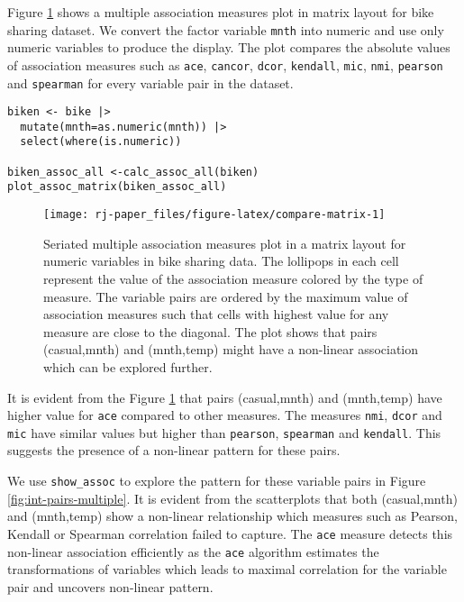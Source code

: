 Figure \ref{fig:compare-matrix} shows a multiple association measures plot in matrix layout for bike sharing dataset. We convert the factor variable \texttt{mnth} into numeric and use only numeric variables to produce the display. The plot compares the absolute values of association measures such as \texttt{ace}, \texttt{cancor}, \texttt{dcor}, \texttt{kendall}, \texttt{mic}, \texttt{nmi}, \texttt{pearson} and \texttt{spearman} for every variable pair in the dataset.

\begin{verbatim}
biken <- bike |>
  mutate(mnth=as.numeric(mnth)) |>
  select(where(is.numeric))

biken_assoc_all <-calc_assoc_all(biken)
plot_assoc_matrix(biken_assoc_all) 
\end{verbatim}

\begin{figure}

{\centering \texttt{[image: rj-paper\_files/figure-latex/compare-matrix-1]} 

}

\caption{Seriated multiple association measures plot in a matrix layout for numeric variables in bike sharing data. The lollipops in each cell represent the value of the association measure colored by the type of measure. The variable pairs are ordered by the maximum value of association measures such that cells with highest value for any measure are close to the diagonal. The plot shows that pairs (casual,mnth) and (mnth,temp) might have a non-linear association which can be explored further.}\label{fig:compare-matrix}
\end{figure}

It is evident from the Figure \ref{fig:compare-matrix} that pairs (casual,mnth) and (mnth,temp) have higher value for \texttt{ace} compared to other measures. The measures \texttt{nmi}, \texttt{dcor} and \texttt{mic} have similar values but higher than \texttt{pearson}, \texttt{spearman} and \texttt{kendall}. This suggests the presence of a non-linear pattern for these pairs.

We use \texttt{show\_assoc} to explore the pattern for these variable pairs in Figure \ref{fig:int-pairs-multiple}. It is evident from the scatterplots that both (casual,mnth) and (mnth,temp) show a non-linear relationship which measures such as Pearson, Kendall or Spearman correlation failed to capture. The \texttt{ace} measure detects this non-linear association efficiently as the \texttt{ace} algorithm estimates the transformations of variables which leads to maximal correlation for the variable pair and uncovers non-linear pattern.

